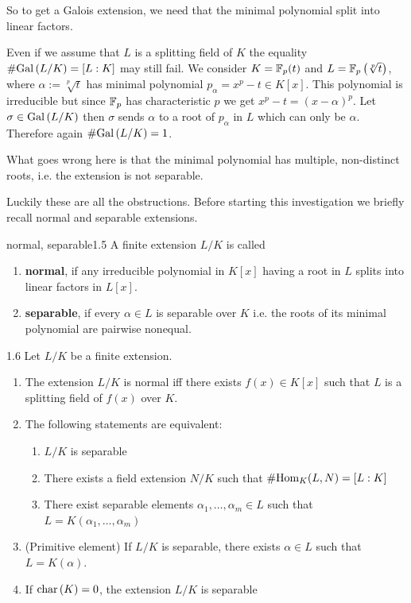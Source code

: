 \documentclass[twoside = false,	%
		headsepline,		%
		parskip = true,
		]{scrbook}						%
\begin{document}
        So to get a Galois extension, we need that the minimal polynomial split into linear factors.
        
        Even if we assume that $L$ is a splitting field of $K$ the equality $\#\mathrm{Gal}\left( L/K\right) = [L:K]$ may still fail. We consider $K = \mathbb F_p(t)$ and $L= \mathbb F_p\left( \sqrt[p]{t}\right)$, where $\alpha:=\sqrt[p]{t}$ has minimal polynomial $p_\alpha = x^p - t \in K[x]$. This polynomial is irreducible but since $\mathbb F_p$ has characteristic $p$ we get $x^p-t = (x-\alpha)^p$. Let $\sigma \in \mathrm{Gal}\left( L/K\right)$ then $\sigma$ sends $\alpha$ to a root of $p_\alpha$ in $L$ which can only be $\alpha$. Therefore again $\#\mathrm{Gal}\left( L/K\right) = 1$.
        
        What goes wrong here is that the minimal polynomial has multiple, non-distinct roots, i.e. the extension is not separable.
        
        Luckily these are all the obstructions. Before starting this investigation we briefly recall normal and separable extensions.
        
        \begin{definition}{normal, separable}{1.5}
            A finite extension $L/K$ is called
            \begin{enumerate}
                \item \textbf{normal}, if any irreducible polynomial in $K[x]$ having a root in $L$ splits into linear factors in $L[x]$.
                \item \textbf{separable}, if every $\alpha \in L$ is separable over $K$ i.e. the roots of its minimal polynomial are pairwise nonequal.
            \end{enumerate}
        \end{definition}

        \begin{proposition}{}{1.6}
            Let $L/K$ be a finite extension.
            \begin{enumerate}
                \item The extension $L/K$ is normal iff there exists $f(x) \in K[x]$ such that $L$ is a splitting field of $f(x)$ over $K$.
                \item The following statements are equivalent:
                    \begin{enumerate}
                        \item $L/K$ is separable
                        \item There exists a field extension $N/K$ such that $\#\mathrm{Hom}_K(L,N) = [L:K]$
                        \item There exist separable elements $\alpha_1,\dots,\alpha_m \in L$ such that $L = K(\alpha_1,\dots,\alpha_m)$
                    \end{enumerate}
                \item (Primitive element) If $L/K$ is separable, there exists $\alpha \in L$ such that $L = K (\alpha)$.
                \item If $\mathrm{char} \,(K)=0$, the extension $L/K$ is separable
            \end{enumerate}
        \end{proposition}
        
\end{document}
